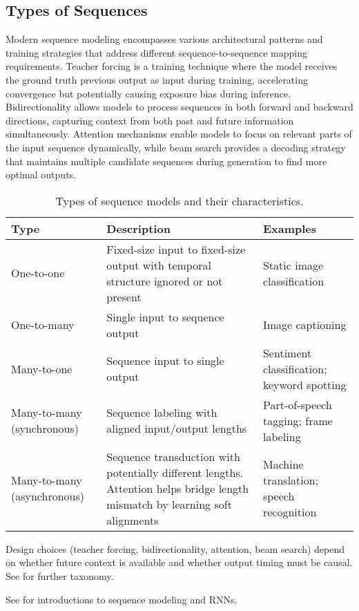 
\subsection{Types of Sequences}

Modern sequence modeling encompasses various architectural patterns and training strategies that address different sequence-to-sequence mapping requirements. Teacher forcing is a training technique where the model receives the ground truth previous output as input during training, accelerating convergence but potentially causing exposure bias during inference. Bidirectionality allows models to process sequences in both forward and backward directions, capturing context from both past and future information simultaneously. Attention mechanisms enable models to focus on relevant parts of the input sequence dynamically, while beam search provides a decoding strategy that maintains multiple candidate sequences during generation to find more optimal outputs.

\begin{table}[h]
\centering
\begin{tabularx}{0.9\textwidth}{p{} *{2}{X}}
\toprule
\textbf{Type} & \textbf{Description} & \textbf{Examples} \\
\midrule
One-to-one & Fixed-size input to fixed-size output with temporal structure ignored or not present & Static image classification \\
\midrule
One-to-many & Single input to sequence output & Image captioning \\
\midrule
Many-to-one & Sequence input to single output & Sentiment classification; keyword spotting \\
\midrule
Many-to-many (synchronous) & Sequence labeling with aligned input/output lengths & Part-of-speech tagging; frame labeling \\
\midrule
Many-to-many (asynchronous) & Sequence transduction with potentially different lengths. Attention helps bridge length mismatch by learning soft alignments \cite{Bahdanau2014} & Machine translation; speech recognition \\
\bottomrule
\end{tabularx}
\caption{Types of sequence models and their characteristics.}
\label{tab:sequence-types}
\end{table}

Design choices (teacher forcing, bidirectionality, attention, beam search) depend on whether future context is available and whether output timing must be causal. See \cite{D2LChapterRNN,WebRNNWikipedia} for further taxonomy.


See \cite{GoodfellowEtAl2016,Prince2023,Bishop2006,WebRNNWikipedia,WebDLBRNN,D2LChapterRNN} for introductions to sequence modeling and RNNs.

